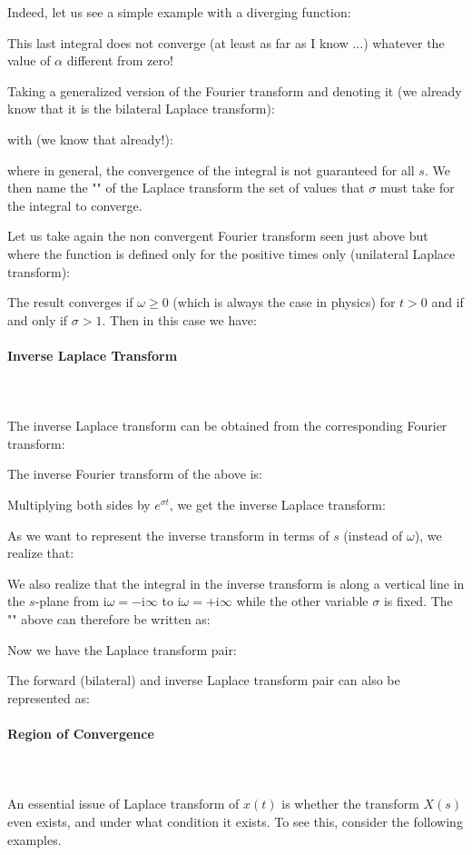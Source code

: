 	Indeed, let us see a simple example with a diverging function:
	
	This last integral does not converge (at least as far as I know ...) whatever the value of $\alpha$ different from zero!
	
	Taking a generalized version of the Fourier transform and denoting it (we already know that it is the bilateral Laplace transform):
	
	with (we know that already!):
	
	where in general, the convergence of the integral is not guaranteed for all $s$. We then name the "" of the Laplace transform the set of values that $\sigma$ must take for the integral to converge.
	
	Let us take again the non convergent Fourier transform seen just above but where the function is defined only for the positive times only (unilateral Laplace transform):
	
	The result converges if $\omega\geq 0$ (which is always the case in physics) for $t>0$ and if and only if $\sigma>1$. Then in this case we have:
	
	
	\paragraph{Inverse Laplace Transform}\mbox{}\\\\
	The inverse Laplace transform can be obtained from the corresponding Fourier	transform:
	
	The inverse Fourier transform of the above is:
	
	Multiplying both sides by $e^{\sigma t}$, we get the inverse Laplace transform:
	
	As we want to represent the inverse transform in terms of $s$ (instead of $\omega$), we realize that:
	
	We also realize that the integral in the inverse transform is along a vertical line in the $s$-plane from $\mathrm{i}\omega=-\mathrm{i}\infty$ to $\mathrm{i}\omega=+\mathrm{i}\infty$ while the other variable $\sigma$ is fixed. The "" above can therefore be written as:
	
	Now we have the Laplace transform pair:
	
	
	The forward (bilateral) and inverse Laplace transform pair can also be represented as:
	
	
	\pagebreak
	\paragraph{Region of Convergence}\mbox{}\\\\
	An essential issue of Laplace transform of $x(t)$ is whether the transform $X(s)$ even exists, and under what condition it exists. To see this, consider the following examples.
	

